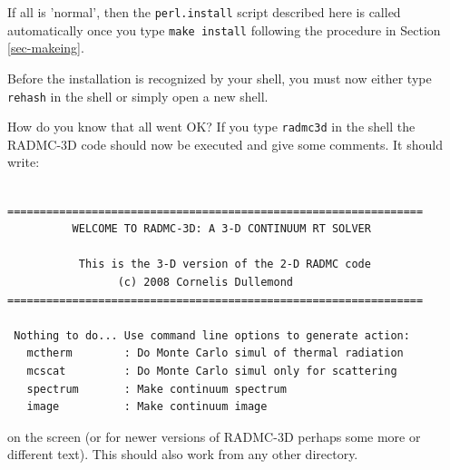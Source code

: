 \documentclass{report}
\newenvironment{asciibox}%
  {\begin{list}{}{%
    \setlength{\topsep}{0.5em}%
    \setlength{\parskip}{0em}%
    \setlength{\parsep}{0em}%
    \setlength{\itemsep}{0em}%
    \setlength{\rightmargin}{0em}%
    \setlength{\leftmargin}{3.0em}%
    \setlength{\labelsep}{1em}%
    \setlength{\labelwidth}{2em}%
  }\normalfont\footnotesize\item}
  {\end{list}}
\begin{document}
If all is 'normal', then the {\small\tt perl.install} script described here is
called automatically once you type {\small\tt make install} following the
procedure in Section \ref{sec-makeing}.

Before the installation is recognized by your shell, you must now either
type {\small\tt rehash} in the shell or simply open a new shell. 

How do you know that all went OK? If you type {\small\tt radmc3d} in the
shell the RADMC-3D code should now be executed and give some comments. It
should write:
\begin{asciibox}\begin{verbatim}

================================================================
          WELCOME TO RADMC-3D: A 3-D CONTINUUM RT SOLVER

           This is the 3-D version of the 2-D RADMC code
                 (c) 2008 Cornelis Dullemond
================================================================

 Nothing to do... Use command line options to generate action:
   mctherm        : Do Monte Carlo simul of thermal radiation
   mcscat         : Do Monte Carlo simul only for scattering
   spectrum       : Make continuum spectrum
   image          : Make continuum image

\end{verbatim}\end{asciibox}
on the screen (or for newer versions of RADMC-3D perhaps some more
or different text). This should also work from any other directory.
\end{document}
